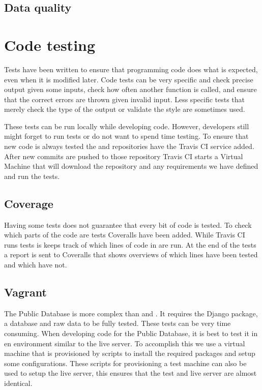 \subsection{Data quality}



\section{Code testing}

Tests have been written to ensure that programming code does what is
expected, even when it is modified later. Code tests can be very
specific and check precise output given some inputs, check how often
another function is called, and ensure that the correct errors are
thrown given invalid input. Less specific tests that merely check the
type of the output or validate the style are sometimes used.

These tests can be run locally while developing code. However,
developers still might forget to run tests or do not want to spend time
testing. To ensure that new code is always tested the \sapphire and
\jsparc repositories have the Travis CI service added. After new commits
are pushed to those repository Travis CI starts a Virtual Machine that
will download the repository and any requirements we have defined and
run the tests.


\subsection{Coverage}

Having some tests does not guarantee that every bit of code is tested.
To check which parts of the code are tests Coveralls have been added.
While Travis CI runs tests is keeps track of which lines of code in
\sapphire are run. At the end of the tests a report is sent to Coveralls
that shows overviews of which lines have been tested and which have not.


\subsection{Vagrant}

The Public Database is more complex than \sapphire and \jsparc. It
requires the Django package, a database and raw data to be fully tested.
These tests can be very time consuming. When developing code for the
Public Database, it is best to test it in en environment similar to the
live server. To accomplish this we use a virtual machine that is
provisioned by scripts to install the required packages and setup some
configurations. These scripts for provisioning a test machine can also
be used to setup the live server, this ensures that the test and live
server are almost identical.

